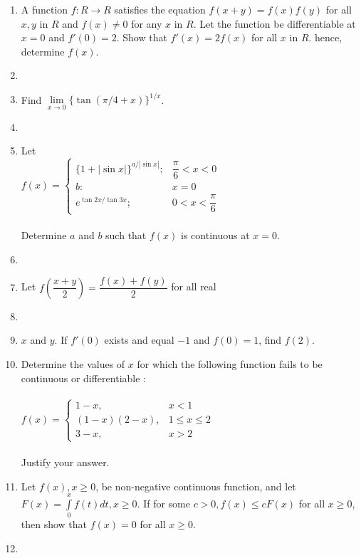 \documentclass[journal,12pt,twocolumn]{IEEEtran}
\begin{document}
\begin{enumerate}
\item A function $f:R \to R$ satisfies the equation $f(x+y)=f(x)f(y)$ for all $x,y$ in $R$ and $f(x)\neq 0$ for any $x$ in $R$. Let the function be differentiable at $x=0$ and $f'(0)=2$. Show that $f'(x)=2f(x)$ for all $x$ in $R$. hence, determine $f(x)$. \item[~]

\item Find $\lim\limits_{x \to 0}\{\tan(\pi/4+x)\}^{1/x}$. \item[~]

\item Let \\$f(x)=\begin{cases}
\{1+|\sin x|\}^{a/|\sin x|}; &\text{$\dfrac{\pi}{6}<x<0$}\\
b: &\text{$x=0$}\\
e^{\tan 2x/\tan 3x}; &\text{$0<x<\dfrac{\pi}{6}$}
\end{cases}$\\ \\Determine $a$ and $b$ such that $f(x)$ is continuous at $x=0$.\item[~]

\item Let $f\left(\dfrac{x+y}{2}\right)=\dfrac{f(x)+f(y)}{2}$ for all real \item[~] \item[~]$x$ and $y$. If $f'(0)$ exists and equal $-1$ and $f(0)=1$, find $f(2)$.\\
 
\item Determine the values of $x$ for which the following function fails to be continuous or differentiable : \\ \\
$f(x)=\begin{cases}
1-x, &\text{$x<1$}\\
(1-x)(2-x), &\text{$1\leq x\leq 2$}\\
3-x, &\text{$x>2$}
\end{cases}$ \\ \\Justify your answer.\\

\item Let $f(x),x\geq 0$, be non-negative continuous function, and let $F(x)=\int\limits_0^xf(t)dt, x\geq 0$. If for some $c>0, f(x)\leq cF(x)$ for all $x\geq 0$, then show that $f(x)=0$ for all $x\geq 0$. \item[~]


\end{enumerate}
\end{document}
